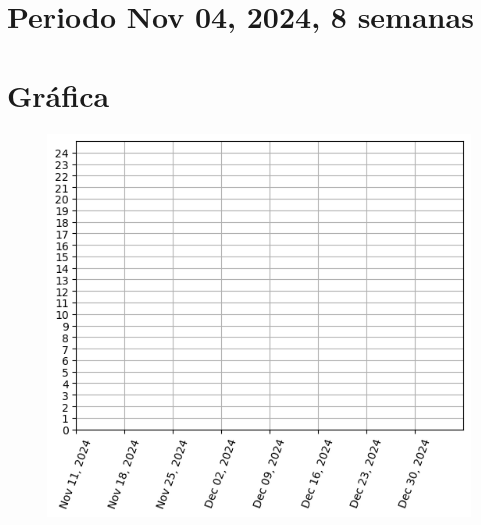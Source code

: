 \documentclass[a4paper,12pt, tikz]{scrartcl}
\begin{document}
 
\section*{Periodo Nov 04, 2024, 8 semanas }

\newpage

\section*{Gráfica}

\begin{figure}[H]
\centering
\includegraphics[scale=1]{graph.png}
\end{figure}

  \newpage
  $\;$
  \newpage
\end{document}
